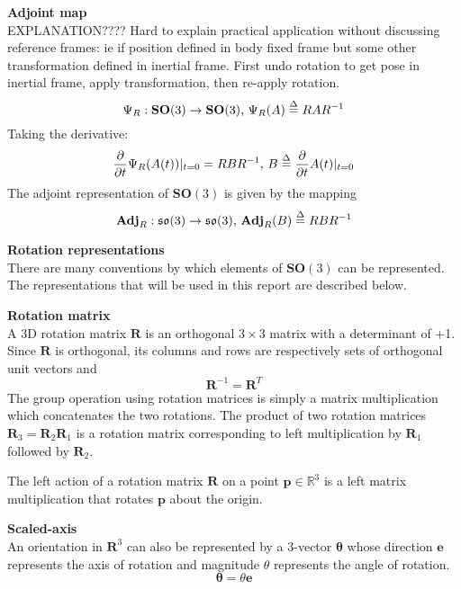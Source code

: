 		\textbf{Adjoint map}\\
		EXPLANATION???? Hard to explain practical application without discussing reference frames: ie if position defined in body fixed frame but some other transformation defined in inertial frame. First undo rotation to get pose in inertial frame, apply transformation, then re-apply rotation.
		\begin{equation}
			\Psi_R: \mathbf{SO}(3) \rightarrow \mathbf{SO}(3) \textnormal{, }
			\Psi_R(A) \stackrel{\Delta}{=} RAR^{-1}
		\end{equation}
		Taking the derivative:
		\begin{equation}
			\frac{\partial}{\partial t} \Psi_R(A(t))|_{t=0} = RBR^{-1} \textnormal{, }
			B \stackrel{\Delta}{=} 	\frac{\partial}{\partial t}A(t)|_{t=0}
		\end{equation}
		The adjoint	representation of $\mathbf{SO}(3)$ is given by the mapping
		\begin{equation}
			\textbf{Adj}_R: \mathfrak{so}(3) \rightarrow \mathfrak{so}(3) \textnormal{, }
			\textbf{Adj}_R(B) \stackrel{\Delta}{=} RBR^{-1}
		\end{equation}
		
		\textbf{Rotation representations}\\		
		There are many conventions by which elements of $\mathbf{SO}(3)$ can be represented. The representations that will be used in this report are described below.
		
		\textbf{Rotation matrix}\\
		A 3D rotation matrix $\mathbf{R}$ is an orthogonal $3 \times 3$ matrix with a determinant of +1. Since $\mathbf{R}$ is orthogonal, its columns and rows are respectively sets of orthogonal unit vectors and
		\begin{equation}
			\mathbf{R}^{-1} = \mathbf{R}^{T}
		\end{equation}		
		The group operation using rotation matrices is simply a matrix multiplication which concatenates the two rotations. The product of two rotation matrices $\mathbf{R}_3 = \mathbf{R}_2\mathbf{R}_1$ is a rotation matrix corresponding to left multiplication by $\mathbf{R}_1$ followed by $\mathbf{R}_2$.
		
		The left action of a rotation matrix $\mathbf{R}$ on a point $\mathbf{p} \in \mathbb{R}^3$ is a left matrix multiplication that rotates $\mathbf{p}$ about the origin.
		
		\textbf{Scaled-axis}\\
		An orientation in $\mathbf{R}^3$ can also be represented by a 3-vector $\bm{\theta}$ whose direction $\mathbf{e}$ represents the axis of rotation and magnitude $\theta$ represents the angle of rotation.
		\begin{equation}
			\bm{\theta} = \theta\mathbf{e}
		\end{equation}
		
